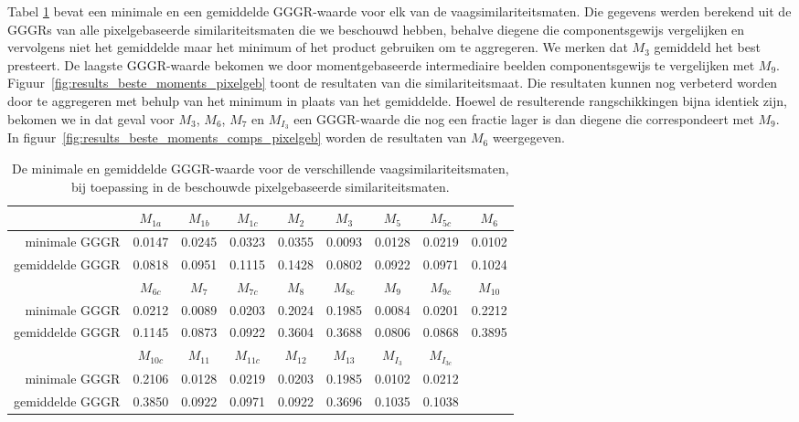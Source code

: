 Tabel \ref{tab:stat_gegevens_pixelgeb_maten} bevat een minimale en een gemiddelde GGGR-waarde voor elk van de vaagsimilariteitsmaten.
Die gegevens werden berekend uit de GGGRs van alle pixelgebaseerde similariteitsmaten
die we beschouwd hebben, behalve diegene die componentsgewijs vergelijken en vervolgens 
niet het gemiddelde maar het 
minimum of het product gebruiken om te aggregeren. We merken dat $M_3$ gemiddeld het best 
presteert. De laagste GGGR-waarde bekomen we door momentgebaseerde intermediaire beelden 
componentsgewijs te vergelijken met $M_9$. Figuur~\ref{fig:results_beste_moments_pixelgeb} 
toont de resultaten van die similariteitsmaat. Die resultaten kunnen nog verbeterd worden 
door te aggregeren met behulp van het minimum in plaats van het gemiddelde. Hoewel de 
resulterende rangschikkingen bijna identiek zijn, bekomen we in dat geval voor $M_3$, $M_6$, 
$M_7$ en $M_{I_3}$ een GGGR-waarde die nog een fractie lager is dan diegene die correspondeert
met $M_9$. In figuur~\ref{fig:results_beste_moments_comps_pixelgeb} worden de resultaten
van $M_6$ weergegeven.

\begin{table}[!b]
\vspace{10pt}
\centering
\small
\begin{tabular}{r|cccccccc}
& $M_{1a}$ & $M_{1b}$ & $M_{1c}$ & $M_{2}$ & $M_{3}$ & $M_{5}$ & $M_{5c}$ & $M_{6}$ \\
\hline
minimale GGGR & 0.0147 & 0.0245 & 0.0323 & 0.0355 & 0.0093 & 0.0128 & 0.0219 & 0.0102 \\
gemiddelde GGGR & 0.0818 & 0.0951 & 0.1115 & 0.1428 & 0.0802 & 0.0922 & 0.0971 & 0.1024\vspace{8pt}\\
& $M_{6c}$ & $M_{7}$ & $M_{7c}$ & $M_{8}$ & $M_{8c}$ & $M_{9}$ & $M_{9c}$ & $M_{10}$ \\
\hline
minimale GGGR & 0.0212 & 0.0089 & 0.0203 & 0.2024 & 0.1985 & 0.0084 & 0.0201 & 0.2212 \\
gemiddelde GGGR & 0.1145 & 0.0873 & 0.0922 & 0.3604 & 0.3688 & 0.0806 & 0.0868 & 0.3895\vspace{8pt}\\
& $M_{10c}$ & $M_{11}$ & $M_{11c}$ & $M_{12}$ & $M_{13}$ & $M_{I_3}$ & $M_{I_{3c}}$ \\
\hline
minimale GGGR & 0.2106 & 0.0128 & 0.0219 & 0.0203 & 0.1985 & 0.0102 & 0.0212 \\
gemiddelde GGGR & 0.3850 & 0.0922 & 0.0971 & 0.0922 & 0.3696 & 0.1035 & 0.1038
\end{tabular}
\vspace{10pt}
\caption{\label{tab:stat_gegevens_pixelgeb_maten}De minimale en gemiddelde GGGR-waarde voor 
de verschillende vaagsimilariteitsmaten, bij toepassing in de beschouwde pixelgebaseerde 
similariteitsmaten.}
\end{table}